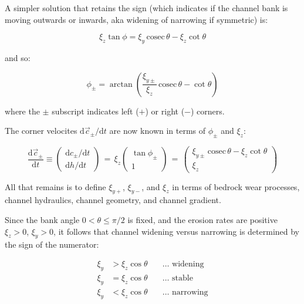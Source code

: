 \documentclass[11pt]{article}
\begin{document}
A simpler solution that retains the sign (which indicates if the channel
bank is moving outwards or inwards, aka widening of narrowing if
symmetric) is:

\begin{equation}
    {\xi_z} \tan\phi
      = {\xi_y} \,\mathrm{cosec}\,\theta - {\xi_z}\cot\theta
\end{equation}

and so:

\begin{equation}
    \phi_\pm
      = \arctan\left(
      \dfrac{\xi_{y\pm}}{\xi_z} \,\mathrm{cosec}\,\theta - \cot\theta
              \right)
\end{equation}

where the \(\pm\) subscript indicates left (\(+\)) or right (\(-\))
corners.

The corner velocites \({\mathrm{d}\vec{c}_\pm}/{\mathrm{d}t}\) are now
known in terms of \(\phi_\pm\) and \(\xi_{z}\):

\begin{equation}
    \dfrac{\mathrm{d}\vec{c}_\pm}{\mathrm{d}t} 
    \equiv 
    \begin{pmatrix}
        \mathrm{d}{c_\pm}/\mathrm{d}{t} \\
        \mathrm{d}{h}/\mathrm{d}{t}
    \end{pmatrix}
    \,=\, {\xi_z} \begin{pmatrix}
        \tan\phi_\pm \\
        1
      \end{pmatrix}
    \,=\, \begin{pmatrix}
        {\xi_{y\pm}} \,\mathrm{cosec}\,\theta  - {\xi_z}\cot\theta \\
        {\xi_z} 
      \end{pmatrix}
\end{equation}

All that remains is to define \(\xi_{y+}\), \(\xi_{y-}\), and
\(\xi_{z}\) in terms of bedrock wear processes, channel hydraulics,
channel geometry, and channel gradient.

Since the bank angle \(0<\theta\leq\pi/2\) is fixed, and the erosion
rates are positive \(\xi_z>0\), \(\xi_y>0\), it follows that channel
widening versus narrowing is determined by the sign of the numerator:

\begin{eqnarray}
    \xi_y &> \xi_z\cos\theta &   \quad\dots\,\,\text{widening} \\
    \xi_y &= \xi_z\cos\theta &   \quad\dots\,\,\text{stable} \\
    \xi_y &< \xi_z\cos\theta &   \quad\dots\,\,\text{narrowing} 
\end{eqnarray}
\end{document}
